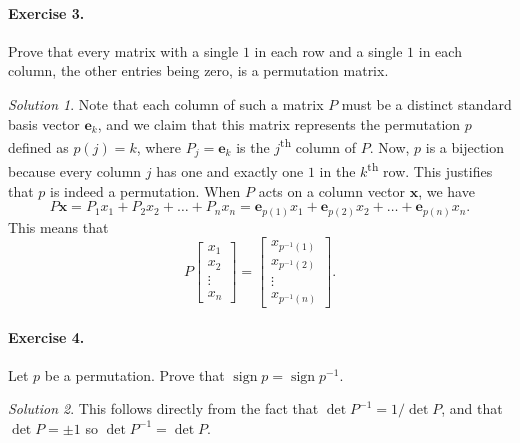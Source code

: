 \documentclass[11pt]{report}
\DeclareMathOperator\sign{sign}
\renewcommand\vec\boldsymbol
\def\vx{\vec{x}}
\def\ve{\vec{e}}
\theoremstyle{remark}
\newtheorem*{solution}{Solution}
\begin{document}
    \paragraph{Exercise 3.} Prove that every matrix with a single $1$ in each row
    and a single $1$ in each column, the other entries being zero, is a permutation
    matrix.
    \begin{solution}
        Note that each column of such a matrix $P$ must be a distinct standard basis
        vector $\ve_k$, and we claim that this matrix represents the permutation $p$
        defined as $p(j) = k$, where $P_j = \ve_k$ is the $j$\textsuperscript{th}
        column of $P$. Now, $p$ is a bijection because every column $j$ has one and exactly one
        $1$ in the $k$\textsuperscript{th} row. This justifies that $p$ is indeed a
        permutation. When $P$ acts on a column vector $\vx$, we
        have \[
            P\vx = P_1x_1 + P_2x_2 + \dots + P_nx_n = \ve_{p(1)}x_1 + \ve_{p(2)}x_2 +
            \dots + \ve_{p(n)}x_n.
        \] This means that \[
            P \begin{bmatrix}
                x_1 \\ x_2 \\ \vdots \\ x_n
            \end{bmatrix}
            = \begin{bmatrix}
                x_{p^{-1}(1)} \\ x_{p^{-1}(2)} \\ \vdots \\ x_{p^{-1}(n)}
            \end{bmatrix}.
        \] 
    \end{solution}
    
    \paragraph{Exercise 4.} Let $p$ be a permutation. Prove that $\sign{p} =
    \sign{p^{-1}}$.
    \begin{solution}
        This follows directly from the fact that $\det{P^{-1}} = 1 / \det P$, and
        that $\det P = \pm 1$ so $\det{P^{-1}} = \det{P}$.
    \end{solution}
\end{document}
